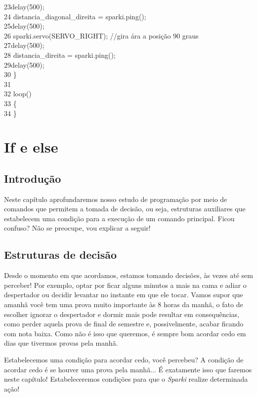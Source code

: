 \documentclass[conference]{IEEEtran}
\begin{document}
{    {\color{cinza}23}\quad\quad delay(500);\\
    {\color{cinza}24}\quad\quad
    distancia\_diagonal\_direita = sparki.ping();\\
    {\color{cinza}25}\quad\quad delay(500);\\
    {\color{cinza}26}\quad\quad
    sparki.servo(SERVO\_RIGHT); 
    {\color{cinza}//gira ára a posição 90 graus}\\
    {\color{cinza}27}\quad\quad delay(500);\\
    {\color{cinza}28}\quad\quad
    distancia\_direita = sparki.ping();\\
    {\color{cinza}29}\quad\quad delay(500);\\
    {\color{cinza}30} \}\\
    {\color{cinza}31}\\
    {\color{cinza}32} loop()\\
    {\color{cinza}33} \{\\
    {\color{cinza}34} \}}\\

\section{\textbf{If e else}}

\begin{center}
\subsection{Introdução}
\end{center}

\par
Neste capítulo aprofundaremos nosso estudo de programação por meio de comandos que permitem a tomada de decisão, ou seja, estruturas auxiliares que estabelecem uma condição para a execução de um comando principal. Ficou confuso? Não se preocupe, vou explicar a seguir!

\begin{center}
\subsection{Estruturas de decisão}
\end{center}
\par
Desde o momento em que acordamos, estamos tomando decisões, às vezes até sem perceber! Por exemplo, optar por ficar alguns minutos a mais na cama e adiar o despertador ou decidir levantar no instante em que ele tocar. Vamos supor que amanhã você tem uma prova muito importante às 8 horas da manhã, o fato de escolher ignorar o despertador e dormir mais pode resultar em consequências, como perder aquela prova de final de semestre e, possivelmente, acabar ficando com nota baixa. Como não é isso que queremos, é sempre bom acordar cedo em dias que tivermos provas pela manhã.
\par
Estabelecemos uma condição para acordar cedo, você percebeu? A condição de acordar cedo é se houver uma prova pela manhã... É exatamente isso que faremos neste capítulo! Estabeleceremos condições para que o \textit{Sparki} realize determinada ação!
\end{document}
